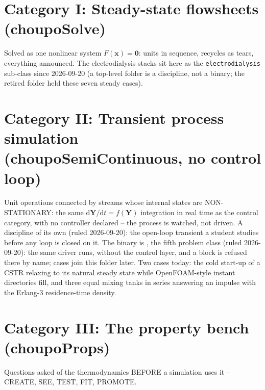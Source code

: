 \documentclass[11pt,a4paper]{article}
\begin{document}
\clearpage
\section*{Category I: Steady-state flowsheets (choupoSolve)}
Solved as one nonlinear system $F(\mathbf{x}) = \mathbf{0}$: units in
sequence, recycles as tears, everything announced.  The electrodialysis
stacks sit here as the \texttt{electrodialysis} sub-class since 2026-09-20
(a top-level folder is a discipline, not a binary; the retired
 folder held these seven steady cases).


\clearpage
\section*{Category II: Transient process simulation (choupoSemiContinuous, no control loop)}
Unit operations connected by streams whose internal states are
NON-STATIONARY: the same $\mathrm{d}\mathbf{Y}/\mathrm{d}t = f(\mathbf{Y})$
integration in real time as the control category, with no controller
declared -- the process is watched, not driven.  A discipline of its own
(ruled 2026-09-20): the open-loop transient a student studies before any
loop is closed on it.  The binary is , the fifth
problem class (ruled 2026-09-20): the same driver  runs,
without the control layer, and a  block is refused there by
name;  cases join this folder later.  Two cases today:
the cold start-up of a CSTR relaxing to its natural steady state while
OpenFOAM-style instant directories fill, and three equal mixing tanks in
series answering an impulse with the Erlang-3 residence-time density.




\clearpage
\section*{Category III: The property bench (choupoProps)}
Questions asked of the thermodynamics BEFORE a simulation uses it --
CREATE, SEE, TEST, FIT, PROMOTE.

\end{document}

